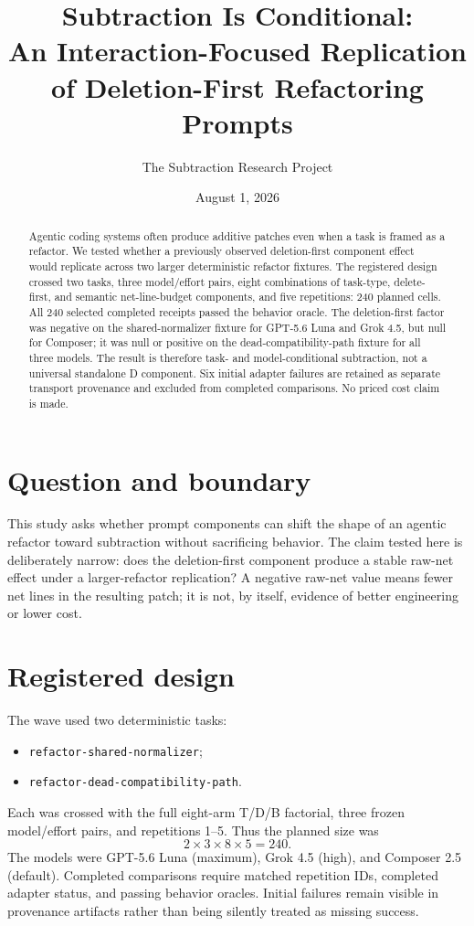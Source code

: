 \documentclass[11pt]{article}
\title{Subtraction Is Conditional:\\
An Interaction-Focused Replication of Deletion-First Refactoring Prompts}
\author{The Subtraction Research Project}
\date{August 1, 2026}
\begin{document}
\maketitle

\begin{abstract}
Agentic coding systems often produce additive patches even when a task is framed
as a refactor. We tested whether a previously observed deletion-first component
effect would replicate across two larger deterministic refactor fixtures. The
registered design crossed two tasks, three model/effort pairs, eight combinations
of task-type, delete-first, and semantic net-line-budget components, and five
repetitions: 240 planned cells. All 240 selected completed receipts passed the
behavior oracle. The deletion-first factor was negative on the shared-normalizer
fixture for GPT-5.6 Luna and Grok 4.5, but null for Composer; it was null or
positive on the dead-compatibility-path fixture for all three models. The result
is therefore task- and model-conditional subtraction, not a universal standalone
D component. Six initial adapter failures are retained as separate transport
provenance and excluded from completed comparisons. No priced cost claim is made.
\end{abstract}

\section{Question and boundary}
This study asks whether prompt components can shift the shape of an agentic
refactor toward subtraction without sacrificing behavior. The claim tested here
is deliberately narrow: does the deletion-first component produce a stable
raw-net effect under a larger-refactor replication? A negative raw-net value
means fewer net lines in the resulting patch; it is not, by itself, evidence of
better engineering or lower cost.

\section{Registered design}
The wave used two deterministic tasks:
\begin{itemize}
\item \texttt{refactor-shared-normalizer};
\item \texttt{refactor-dead-compatibility-path}.
\end{itemize}
Each was crossed with the full eight-arm T/D/B factorial, three frozen
model/effort pairs, and repetitions 1--5. Thus the planned size was
\[
  2 \times 3 \times 8 \times 5 = 240.
\]
The models were GPT-5.6 Luna (maximum), Grok 4.5 (high), and Composer 2.5
(default). Completed comparisons require matched repetition IDs, completed
adapter status, and passing behavior oracles. Initial failures remain visible
in provenance artifacts rather than being silently treated as missing success.
\end{document}

